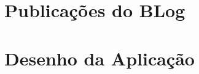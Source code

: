 
\begin{apendicesenv}

\partapendices

\chapter{Publicações do BLog}



\chapter{Desenho da Aplicação}


\end{apendicesenv}

